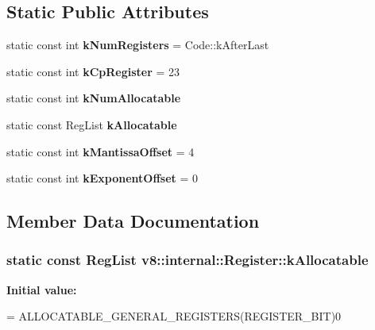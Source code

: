 \subsection*{Static Public Attributes}
\begin{DoxyCompactItemize}
\item 
static const int {\bfseries k\+Num\+Registers} = Code\+::k\+After\+Last\hypertarget{structv8_1_1internal_1_1_register_a071eeecddb79296df8240ffb622cc5c7}{}\label{structv8_1_1internal_1_1_register_a071eeecddb79296df8240ffb622cc5c7}

\item 
static const int {\bfseries k\+Cp\+Register} = 23\hypertarget{structv8_1_1internal_1_1_register_affe9c4a6899a485ce9231426c5fdafc3}{}\label{structv8_1_1internal_1_1_register_affe9c4a6899a485ce9231426c5fdafc3}

\item 
static const int {\bfseries k\+Num\+Allocatable}
\item 
static const Reg\+List {\bfseries k\+Allocatable}
\item 
static const int {\bfseries k\+Mantissa\+Offset} = 4\hypertarget{structv8_1_1internal_1_1_register_a5037d9a526da5142e5d7418ae9cab93e}{}\label{structv8_1_1internal_1_1_register_a5037d9a526da5142e5d7418ae9cab93e}

\item 
static const int {\bfseries k\+Exponent\+Offset} = 0\hypertarget{structv8_1_1internal_1_1_register_acd95df28a73fd51f19ebf91ce0e6a2a5}{}\label{structv8_1_1internal_1_1_register_acd95df28a73fd51f19ebf91ce0e6a2a5}

\end{DoxyCompactItemize}


\subsection{Member Data Documentation}
\subsubsection[{\texorpdfstring{k\+Allocatable}{kAllocatable}}]{\setlength{\rightskip}{0pt plus 5cm}static const Reg\+List v8\+::internal\+::\+Register\+::k\+Allocatable\hspace{0.3cm}{\ttfamily [static]}}\hypertarget{structv8_1_1internal_1_1_register_aa5f41eb26ce82b340a50e4791bf089ba}{}\label{structv8_1_1internal_1_1_register_aa5f41eb26ce82b340a50e4791bf089ba}
{\bfseries Initial value\+:}
\begin{DoxyCode}
=
      ALLOCATABLE\_GENERAL\_REGISTERS(REGISTER\_BIT)0
\end{DoxyCode}
